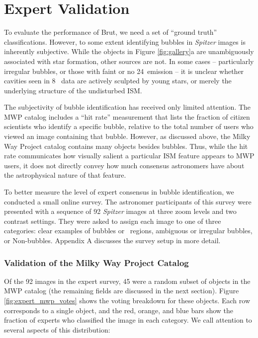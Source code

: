 \section{Expert Validation}
\label{sec:expert}

To evaluate the performance of Brut, we need a set of ``ground truth'' classifications. However, to some extent identifying bubbles in \textit{Spitzer} images is inherently subjective. While the objects in Figure \ref{fig:gallery}a are unambiguously associated with star formation, other sources are not. In some cases -- particularly irregular bubbles, or those with faint or no 24\um\, emission -- it is unclear whether cavities seen in 8 \um\, data are actively sculpted by young stars, or merely the underlying structure of the undisturbed ISM.

The subjectivity of bubble identification has received only limited attention. The MWP catalog includes a ``hit rate'' measurement that lists the fraction of citizen scientists who identify a specific bubble, relative to the total number of users who viewed an image containing that bubble. However, as discussed above, the Milky Way Project catalog contains many objects besides bubbles. Thus, while the hit rate communicates how visually salient a particular ISM feature appears to MWP users, it does not directly convey how much consensus astronomers have about the astrophysical nature of that feature.

To better measure the level of expert consensus in bubble identification, we conducted a small online survey. The astronomer participants of this survey were presented with a sequence of 92 \emph{Spitzer} images at three zoom levels and two contrast settings. They were asked to assign each image to one of three categories: clear examples of bubbles or \hii\, regions, ambiguous or irregular bubbles, or Non-bubbles. Appendix A discusses the survey setup in more detail.

\subsubsection{Validation of the Milky Way Project Catalog}
\label{sec:expert_mwp}
Of the 92 images in the expert survey, 45 were a random subset of objects in the MWP catalog (the remaining fields are discussed in the next section). Figure \ref{fig:expert_mwp_votes} shows the voting breakdown for these objects. Each row corresponds to a single object, and the red, orange, and blue bars show the fraction of experts who classified the image in each category.  We call attention to several aspects of this distribution:


